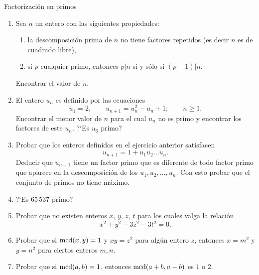 \begin{section}{Factorización en primos}
\begin{enumerate}
\item Sea $n$ un entero con las siguientes propiedades: 
\begin{enumerate}[label=(\alph*)]
	\item  la
	descomposición prima de $n$ no tiene factores repetidos (es decir
	$n$ es de cuadrado libre), 
	\item si $p$ cualquier primo, entonces
	$p|n$ si  y sólo si $(p-1)|n$.
\end{enumerate}
Encontrar el valor de $n$.

\item El entero $u_n$ es definido por las ecuaciones
$$
u_1=2,\qquad u_{n+1}=u_n^2-u_n+1;\qquad \text{$n\ge1$}.
$$
Encontrar el menor valor de $n$ para el cual $u_n$ no es primo y
encontrar los factores de este $u_n$. ?`Es $u_6$ primo?

\item Probar que los enteros definidos en el ejercicio anterior satisfacen
$$
u_{n+1}= 1 + u_1u_2 \ldots u_n.
$$
Deducir que $u_{n+1}$ tiene un factor primo que es diferente de
todo factor primo que aparece en la descomposición de los
$u_1,u_2,\ldots,u_n$. Con esto probar que el conjunto de primos no
tiene máximo.

\item ?`Es $65\,537$ primo?

\item Probar que no existen enteros $x$, $y$, $z$, $t$ para los cuales
valga la relación
$$x^2+y^2-3z^2-3t^2=0.
$$

\item Probar que si $\operatorname{mcd}(x,y)=1$ y $xy=z^2$ para algún entero $z$,
entonces $x=m^2$ y $y=n^2$ para ciertos enteros $m,n$.

\item Probar que si $\operatorname{mcd}(a,b)=1$, entonces $\operatorname{mcd}(a+b,a-b)$ es $1$ o $2$.
\end{enumerate}
\end{section}



